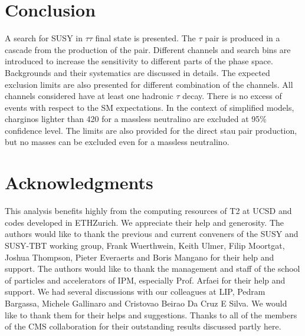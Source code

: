 \section{Conclusion}
\label{sect:conclusion}
A search for SUSY in $\tau\tau$ final state is presented. The $\tau$ pair is produced in a cascade from the production of the \PSGcpDo pair.
Different channels and search bins are introduced to increase the sensitivity to different parts of the phase space. 
Backgrounds and their systematics are discussed in details. 
The expected exclusion limits are also presented for different combination of the channels.
All channels considered have at least one hadronic $\tau$ decay.
There is no excess of events with respect to the SM expectations.
In the context of simplified models, charginos lighter than 420 \GeV 
for a massless neutralino  are excluded at 95\% confidence level.
The limits are also provided for the direct stau pair production, but no masses  can be excluded 
even for a massless neutralino.


\section{Acknowledgments}
This analysis benefits highly from the computing resources of T2 at UCSD and codes developed in ETHZurich. 
We appreciate their help and generosity.
The authors would like to thank the previous and current conveners of the SUSY and SUSY-TBT working group, Frank Wuerthwein, Keith Ulmer, Filip Moortgat, Joshua Thompson, Pieter Everaerts and Boris Mangano for their help and support. 
The authors would like to thank the management and staff of the school of particles 
and accelerators of IPM, especially Prof. Arfaei for their help and support. 
We had several discussions with our colleagues at LIP, Pedram Bargassa, Michele Gallinaro and Cristovao Beirao Da Cruz E Silva. 
We would like to thank them for their helps and suggestions.
Thanks to all of the members of
the CMS collaboration for their outstanding results discussed partly here.
